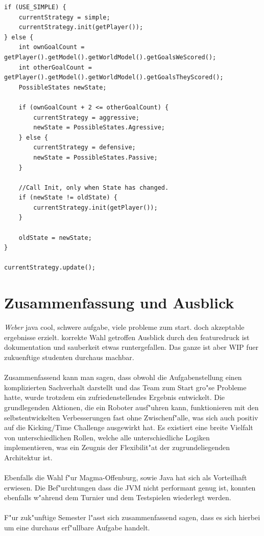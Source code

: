 \documentclass[fontsize=12pt,a4paper,final]{scrartcl}[2003/01/01]
\begin{document}
\begin{lstlisting}[caption=Interne Logik des Strategie-Entscheiders, captionpos=b]
if (USE_SIMPLE) {
    currentStrategy = simple;
    currentStrategy.init(getPlayer());
} else {
    int ownGoalCount = getPlayer().getModel().getWorldModel().getGoalsWeScored();
    int otherGoalCount = getPlayer().getModel().getWorldModel().getGoalsTheyScored();
    PossibleStates newState;

    if (ownGoalCount + 2 <= otherGoalCount) {
        currentStrategy = aggressive;
        newState = PossibleStates.Agressive;
    } else {
        currentStrategy = defensive;
        newState = PossibleStates.Passive;
    }

    //Call Init, only when State has changed.
    if (newState != oldState) {
        currentStrategy.init(getPlayer());
    }

    oldState = newState;
}

currentStrategy.update();
\end{lstlisting}

\section{Zusammenfassung und Ausblick}
\textit{Weber}
java cool, schwere aufgabe, viele probleme zum start. doch akzeptable ergebnisse erzielt. korrekte Wahl getroffen Ausblick durch den featuredruck ist dokumentation und sauberkeit etwas runtergefallen. Das ganze ist aber WIP fuer zukuenftige studenten durchaus machbar.\\
\\
Zusammenfassend kann man sagen, dass obwohl die Aufgabenstellung einen komplizierten Sachverhalt darstellt und das Team zum Start gro"se Probleme hatte, wurde trotzdem ein zufriedenstellendes Ergebnis entwickelt. Die grundlegenden Aktionen, die ein Roboter ausf"uhren kann, funktionieren mit den selbstentwickelten Verbesserungen fast ohne Zwischenf"alle, was sich auch positiv auf die Kicking/Time Challenge ausgewirkt hat. Es existiert eine breite Vielfalt von unterschiedlichen Rollen, welche alle unterschiedliche Logiken implementieren, was ein Zeugnis der Flexibilit"at der zugrundeliegenden Architektur ist.\\
\\
Ebenfalls die Wahl f"ur Magma-Offenburg, sowie Java hat sich als Vorteilhaft erwiesen. Die Bef"urchtungen dass die JVM nicht performant genug ist, konnten ebenfalls w"ahrend dem Turnier und dem Testspielen wiederlegt werden.\\
\\
F"ur zuk"unftige Semester l"asst sich zusammenfassend sagen, dass es sich hierbei um eine durchaus erf"ullbare Aufgabe handelt.\\
\end{document}
